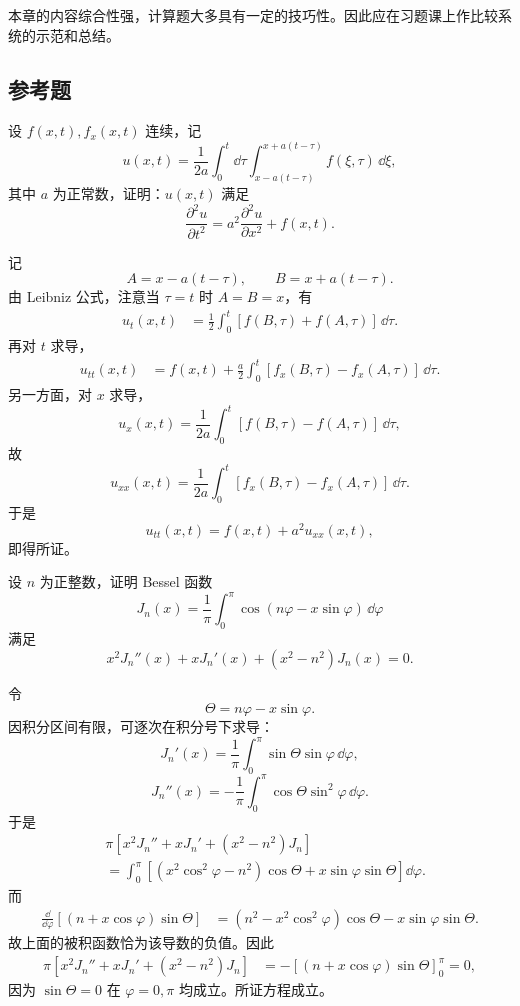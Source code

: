 本章的内容综合性强，计算题大多具有一定的技巧性。因此应在习题课上作比较系统的示范和总结。

\subsection{参考题}
\begin{xreferenceproblem}[1]
设 $f(x,t),f_x(x,t)$ 连续，记
  \[
    u(x,t)=\frac1{2a}\int_0^t\dd\tau\int_{x-a(t-\tau)}^{x+a(t-\tau)}f(\xi,\tau)\,\dd\xi,
  \]
  其中 $a$ 为正常数，证明：$u(x,t)$ 满足
  \[
    \frac{\partial^2u}{\partial t^2}=a^2\frac{\partial^2u}{\partial x^2}+f(x,t).
  \]
\end{xreferenceproblem}
\begin{xsolution}
记
\[
A=x-a(t-\tau),\qquad B=x+a(t-\tau).
\]
由 Leibniz 公式，注意当 $\tau=t$ 时 $A=B=x$，有
\[
\begin{aligned}
u_t(x,t)
&=\frac12\int_0^t[f(B,\tau)+f(A,\tau)]\,\dd\tau.
\end{aligned}
\]
再对 $t$ 求导，
\[
\begin{aligned}
u_{tt}(x,t)
&=f(x,t)+\frac a2\int_0^t
[f_x(B,\tau)-f_x(A,\tau)]\,\dd\tau.
\end{aligned}
\]
另一方面，对 $x$ 求导，
\[
u_x(x,t)=\frac1{2a}\int_0^t[f(B,\tau)-f(A,\tau)]\,\dd\tau,
\]
故
\[
u_{xx}(x,t)=\frac1{2a}\int_0^t
[f_x(B,\tau)-f_x(A,\tau)]\,\dd\tau.
\]
于是
\[
u_{tt}(x,t)=f(x,t)+a^2u_{xx}(x,t),
\]
即得所证。
\end{xsolution}


\begin{xreferenceproblem}[2]
设 $n$ 为正整数，证明 Bessel 函数
  \[
    J_n(x)=\frac1\pi\int_0^\pi\cos(n\varphi-x\sin\varphi)\,\dd\varphi
  \]
  满足
  \[
    x^2J_n''(x)+xJ_n'(x)+(x^2-n^2)J_n(x)=0.
  \]
\end{xreferenceproblem}
\begin{xsolution}
令
\[
\Theta=n\varphi-x\sin\varphi.
\]
因积分区间有限，可逐次在积分号下求导：
\[
J_n'(x)=\frac1\pi\int_0^\pi\sin\Theta\sin\varphi\,\dd\varphi,
\]
\[
J_n''(x)=-\frac1\pi\int_0^\pi\cos\Theta\sin^2\varphi\,\dd\varphi.
\]
于是
\[
\begin{aligned}
&\pi[x^2J_n''+xJ_n'+(x^2-n^2)J_n]\\
&=\int_0^\pi
\left[(x^2\cos^2\varphi-n^2)\cos\Theta
+x\sin\varphi\sin\Theta\right]\dd\varphi.
\end{aligned}
\]
而
\[
\begin{aligned}
\frac{\dd}{\dd\varphi}[(n+x\cos\varphi)\sin\Theta]
&=(n^2-x^2\cos^2\varphi)\cos\Theta
-x\sin\varphi\sin\Theta.
\end{aligned}
\]
故上面的被积函数恰为该导数的负值。因此
\[
\begin{aligned}
\pi[x^2J_n''+xJ_n'+(x^2-n^2)J_n]
&=-[(n+x\cos\varphi)\sin\Theta]_0^\pi=0,
\end{aligned}
\]
因为 $\sin\Theta=0$ 在 $\varphi=0,\pi$ 均成立。所证方程成立。
\end{xsolution}


